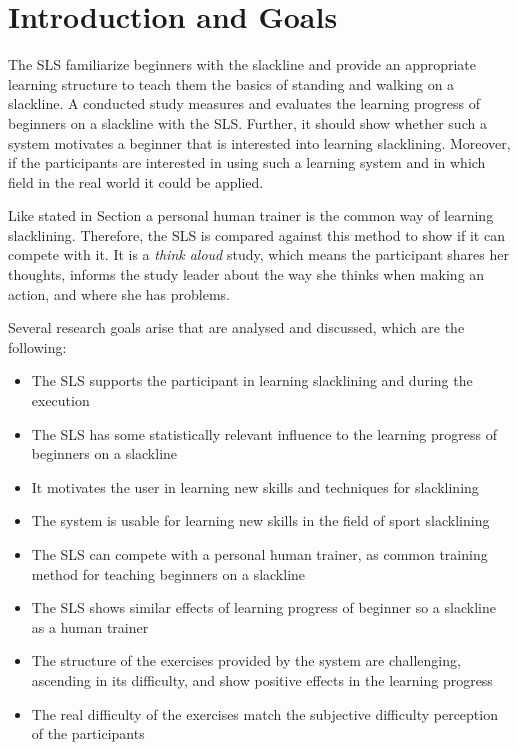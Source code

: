 \section{Introduction and Goals}\label{6_introduction}
The SLS familiarize beginners with the slackline and provide an appropriate learning structure to teach them the basics of standing and walking on a slackline.
A conducted study measures and evaluates the learning progress of beginners on a slackline with the SLS.
Further, it should show whether such a system motivates a beginner that is interested into learning slacklining.
Moreover, if the participants are interested in using such a learning system and in which field in the real world it could be applied.

Like stated in Section  a personal human trainer is the common way of learning slacklining.
Therefore, the SLS is compared against this method to show if it can compete with it.
It is a \textit{think aloud} study, which means the participant shares her thoughts, informs the study leader about the way she thinks when making an action, and where she has problems.

Several research goals arise that are analysed and discussed, which are the following:

\begin{itemize}
\item The SLS supports the participant in learning slacklining and during the execution
\item The SLS has some statistically relevant influence to the learning progress of beginners on a slackline
\item It motivates the user in learning new skills and techniques for slacklining
\item The system is usable for learning new skills in the field of sport slacklining
\item The SLS can compete with a personal human trainer, as common training method for teaching beginners on a slackline
\item The SLS shows similar effects of learning progress of beginner so a slackline as a human trainer
\item The structure of the exercises provided by the system are challenging, ascending in its difficulty, and show positive effects in the learning progress
\item The real difficulty of the exercises match the subjective difficulty perception of the participants
\end{itemize}
